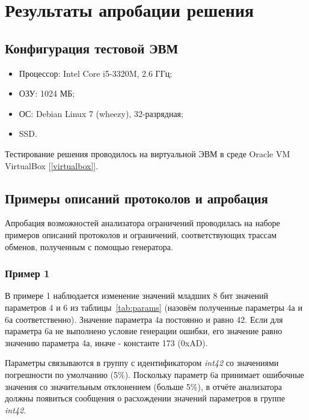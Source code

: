 \section{Результаты апробации решения}


\subsection{Конфигурация тестовой ЭВМ}
\label{subsec:test_stand}

\begin{itemize}
 \item Процессор: Intel Core i5-3320M, 2.6 ГГц;
 \item ОЗУ: 1024 МБ;
 \item ОС: Debian Linux 7 (wheezy), 32-разрядная;
 \item SSD. 
\end{itemize}

Тестирование решения проводилось на виртуальной ЭВМ в среде Oracle VM 
VirtualBox [\ref{virtualbox}].

\subsection{Примеры описаний протоколов и апробация}

Апробация возможностей анализатора ограничений проводилась на наборе примеров 
описаний протоколов и ограничений, соответствующих трассам обменов, полученным 
с помощью генератора.

\subsubsection{Пример 1}

В примере 1 наблюдается изменение значений младших 8 бит значений параметров 4 
и 6 из таблицы~\ref{tab:params} (назовём полученные параметры 4а и 6а 
соответственно). Значение параметра 4а 
постоянно и равно 42. Если для параметра 6а не выполнено условие генерации 
ошибки, его значение равно значению параметра 4а, иначе - константе 173 (0xAD). 

Параметры связываются в группу с идентификатором \textit{int42} со 
значениями погрешности по умолчанию (5\%). Поскольку параметр 6а принимает 
ошибочные значения со значительным отклонением (больше 5\%), в отчёте 
анализатора должны появиться сообщения о расхождении значений параметров в 
группе \textit{int42}.

